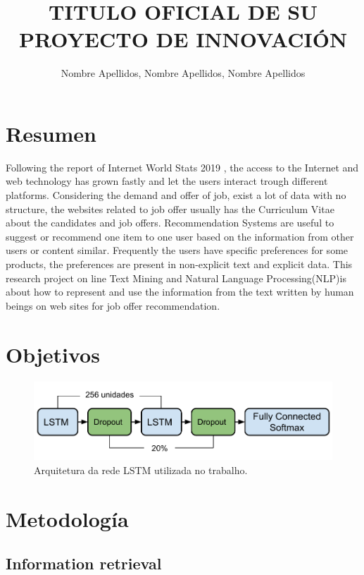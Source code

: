 \documentclass[isoft]{ufgtexposter}
\title{\uppercase{Titulo oficial de su \\ proyecto de innovación}}
\author{Nombre Apellidos, Nombre Apellidos, Nombre Apellidos}
\begin{document}
    \begin{poster}
    
    \section{Resumen}
    Following the report of Internet World Stats 2019 \cite{b1}, the access to the Internet and web technology has grown fastly and let the users interact trough different platforms. Considering the demand and offer of job, exist a lot of data with no structure, the websites related to job offer usually has the Curriculum Vitae about the candidates and job offers.
    Recommendation Systems are useful to suggest or recommend one item to one user based on the information from other users or content similar. Frequently the users have specific preferences \cite{b2} for some products, the preferences are present in non-explicit text and explicit data.
    This research project on line Text Mining \cite{b3} and Natural Language Processing(NLP)is about how to represent and use the information from the text written by human beings on web sites for job offer recommendation.
        
    \section{Objetivos}%
    \begin{figure}
            \centering
            \captionsetup{type=figure}
            \includegraphics[scale=2.3]{modelo-lstm}
            \caption{Arquitetura da rede LSTM utilizada no trabalho.}
            \label{fig:lstm}
    \end{figure}
    \section{Metodología}
    
        
        \subsection{Information  retrieval}
        

\end{poster}
\end{document}
